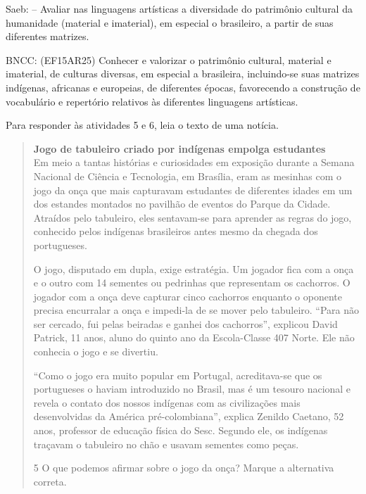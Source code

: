 \begin{escolha}
\begin{mdframed}[linewidth=2pt,linecolor=salmao]
{Saeb: -- Avaliar nas linguagens artísticas a diversidade do patrimônio
cultural da humanidade (material e imaterial), em especial o brasileiro,
a partir de suas diferentes matrizes.

BNCC: (EF15AR25) Conhecer e valorizar o patrimônio cultural, material e
imaterial, de culturas diversas, em especial a brasileira, incluindo-se
suas matrizes indígenas, africanas e europeias, de diferentes épocas,
favorecendo a construção de vocabulário e repertório relativos às
diferentes linguagens artísticas.}
\end{mdframed}

Para responder às atividades 5 e 6, leia o texto de uma notícia.

\begin{quote}
\textbf{Jogo de tabuleiro criado por indígenas empolga estudantes}\\
Em meio a tantas histórias e curiosidades em exposição durante a Semana
Nacional de Ciência e Tecnologia, em Brasília, eram as mesinhas com o
jogo da onça que mais capturavam estudantes de diferentes idades em um
dos estandes montados no pavilhão de eventos do Parque da Cidade.
Atraídos pelo tabuleiro, eles sentavam-se para aprender as regras do
jogo, conhecido pelos indígenas brasileiros antes mesmo da chegada dos
portugueses.

O jogo, disputado em dupla, exige estratégia. Um jogador fica com a onça
e o outro com 14 sementes ou pedrinhas que representam os cachorros. O
jogador com a onça deve capturar cinco cachorros enquanto o oponente
precisa encurralar a onça e impedi-la de se mover pelo tabuleiro. ``Para
não ser cercado, fui pelas beiradas e ganhei dos cachorros'', explicou
David Patrick, 11 anos, aluno do quinto ano da Escola-Classe 407 Norte.
Ele não conhecia o jogo e se divertiu.

``Como o jogo era muito popular em Portugal, acreditava-se que os
portugueses o haviam introduzido no Brasil, mas é um tesouro nacional e
revela o contato dos nossos indígenas com as civilizações mais
desenvolvidas da América pré-colombiana'', explica Zenildo Caetano, 52
anos, professor de educação física do Sesc. Segundo ele, os indígenas
traçavam o tabuleiro no chão e usavam sementes como peças.


\num{5} O que podemos afirmar sobre o jogo da onça? Marque a alternativa correta.


\end{quote}
\end{escolha}
